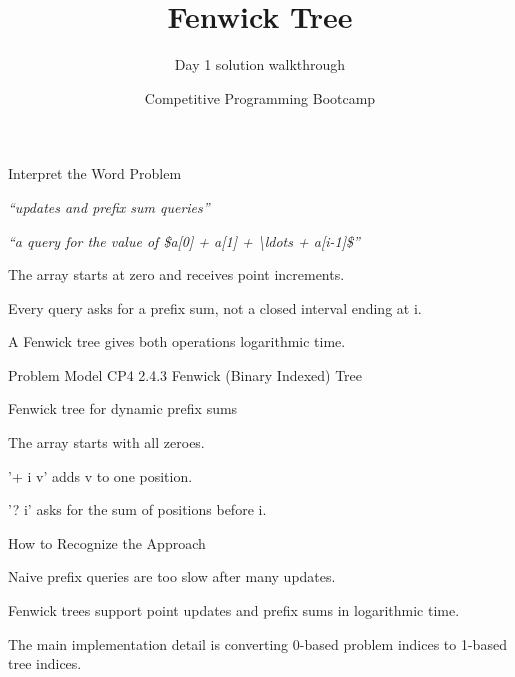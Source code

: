 \documentclass[aspectratio=169,11pt]{beamer}
\title[fenwick]{Fenwick Tree}
\subtitle{Day 1 solution walkthrough}
\author[Solution Deck]{Competitive Programming Bootcamp}
\date{}
\begin{document}
\begin{frame}[plain]
  \titlepage
\end{frame}

\begin{frame}{Interpret the Word Problem}
\small
{}
\begin{tightitemize}
  \item \textit{``updates and prefix sum queries''}
  \item \textit{``a query for the value of \$a[0] + a[1] + \textbackslash{}ldots + a[i-1]\$''}
\end{tightitemize}

\vspace{0.18cm}
\begin{tightitemize}
  \item The array starts at zero and receives point increments.
  \item Every query asks for a prefix sum, not a closed interval ending at i.
  \item A Fenwick tree gives both operations logarithmic time.
\end{tightitemize}
\end{frame}







\begin{frame}{Problem Model}
\small
{} CP4 2.4.3 Fenwick (Binary Indexed) Tree

\vspace{0.25cm}
 Fenwick tree for dynamic prefix sums

\vspace{0.25cm}
\begin{tightitemize}
  \item The array starts with all zeroes.
  \item '+ i v' adds v to one position.
  \item '? i' asks for the sum of positions before i.
\end{tightitemize}
\end{frame}

\begin{frame}{How to Recognize the Approach}
\begin{tightitemize}
  \item Naive prefix queries are too slow after many updates.
  \item Fenwick trees support point updates and prefix sums in logarithmic time.
  \item The main implementation detail is converting 0-based problem indices to 1-based tree indices.
\end{tightitemize}
\end{frame}
\end{document}
